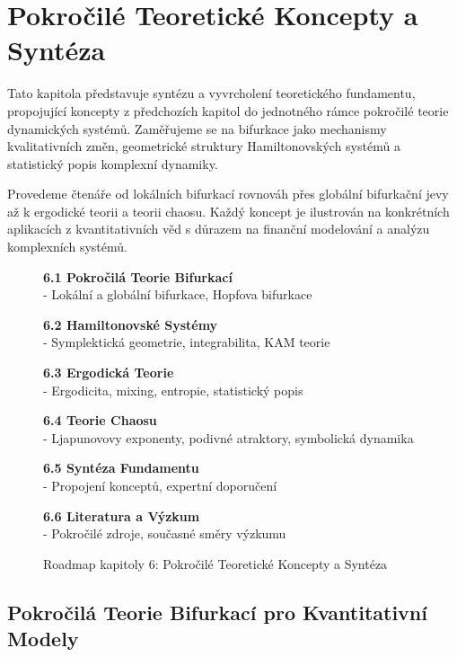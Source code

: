 \section{Pokročilé Teoretické Koncepty a Syntéza}
\label{sec:pokrocile-teoreticke-koncepty}

Tato kapitola představuje syntézu a vyvrcholení teoretického fundamentu, propojující koncepty z předchozích kapitol do jednotného rámce pokročilé teorie dynamických systémů. Zaměřujeme se na bifurkace jako mechanismy kvalitativních změn, geometrické struktury Hamiltonovských systémů a statistický popis komplexní dynamiky.

Provedeme čtenáře od lokálních bifurkací rovnováh přes globální bifurkační jevy až k ergodické teorii a teorii chaosu. Každý koncept je ilustrován na konkrétních aplikacích z kvantitativních věd s důrazem na finanční modelování a analýzu komplexních systémů.

\begin{figure}[H]
\begin{tcolorbox}[title=Roadmap Kapitoly 6]
\item[] \textbf{6.1 Pokročilá Teorie Bifurkací} \\- Lokální a globální bifurkace, Hopfova bifurkace
\item[] \textbf{6.2 Hamiltonovské Systémy} \\- Symplektická geometrie, integrabilita, KAM teorie  
\item[] \textbf{6.3 Ergodická Teorie} \\- Ergodicita, mixing, entropie, statistický popis
\item[] \textbf{6.4 Teorie Chaosu} \\- Ljapunovovy exponenty, podivné atraktory, symbolická dynamika
\item[] \textbf{6.5 Syntéza Fundamentu} \\- Propojení konceptů, expertní doporučení
\item[] \textbf{6.6 Literatura a Výzkum} \\- Pokročilé zdroje, současné směry výzkumu
\end{tcolorbox}
\caption{Roadmap kapitoly 6: Pokročilé Teoretické Koncepty a Syntéza}
\label{fig:roadmap-chapter6}
\end{figure}

\spc

\subsection{Pokročilá Teorie Bifurkací pro Kvantitativní Modely}

